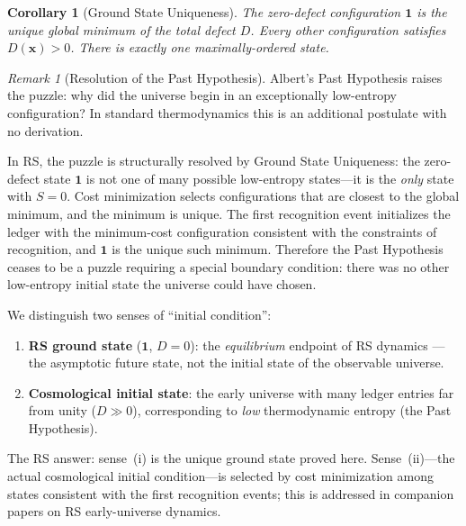 \documentclass[12pt,a4paper]{article}
\newtheorem{corollary}[theorem]{Corollary}
\theoremstyle{definition}
\theoremstyle{remark}
\newtheorem{remark}[theorem]{Remark}
\begin{document}
\begin{corollary}[Ground State Uniqueness]
\label{cor:ground-state}
The zero-defect configuration $\mathbf{1}$ is the unique global
minimum of the total defect $D$.  Every other configuration satisfies
$D(\mathbf{x}) > 0$.  There is exactly one maximally-ordered state.
\end{corollary}

\begin{remark}[Resolution of the Past Hypothesis]
\label{rem:past}
Albert's Past Hypothesis raises the puzzle: why did the universe begin
in an exceptionally low-entropy configuration?  In standard
thermodynamics this is an additional postulate with no derivation.

In RS, the puzzle is structurally resolved by Ground State Uniqueness:
the zero-defect state $\mathbf{1}$ is not one of many possible
low-entropy states---it is the \emph{only} state with $S = 0$.  Cost
minimization selects configurations that are closest to the global
minimum, and the minimum is unique.  The first recognition event
initializes the ledger with the minimum-cost configuration consistent
with the constraints of recognition, and $\mathbf{1}$ is the unique such
minimum.  Therefore the Past Hypothesis ceases to be a puzzle requiring
a special boundary condition: there was no other low-entropy initial
state the universe could have chosen.

We distinguish two senses of ``initial condition'':
\begin{enumerate}[label=(\roman*),nosep]
  \item \textbf{RS ground state} ($\mathbf{1}$, $D=0$): the
  \emph{equilibrium} endpoint of RS dynamics --- the asymptotic future
  state, not the initial state of the observable universe.
  \item \textbf{Cosmological initial state}: the early universe with
  many ledger entries far from unity ($D \gg 0$), corresponding to
  \emph{low} thermodynamic entropy (the Past Hypothesis).
\end{enumerate}
The RS answer: sense~(i) is the unique ground state proved here.
Sense~(ii)---the actual cosmological initial condition---is selected
by cost minimization among states consistent with the first recognition
events; this is addressed in companion papers on RS early-universe
dynamics.
\end{remark}
\end{document}
